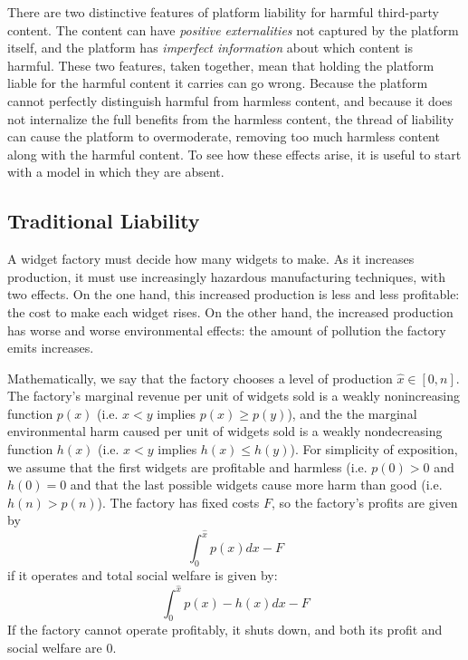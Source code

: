 There are two distinctive features of platform liability for harmful third-party content. The content can have \emph{positive externalities} not captured by the platform itself, and the platform has \emph{imperfect information} about which content is harmful. These two features, taken together, mean that holding the platform liable for the harmful content it carries can go wrong. Because the 
platform cannot perfectly distinguish harmful from harmless content, and because it does not internalize the full benefits from the harmless content, the thread of liability can cause the platform to overmoderate, removing too much harmless content along with the harmful content. To see how these effects arise, it is useful to start with a model in which they are absent.


\subsection{Traditional Liability}

A widget factory must decide how many widgets to make. As it increases production, it must use increasingly hazardous manufacturing techniques, with two effects.  On the one hand, this increased production is less and less profitable: the cost to make each widget rises. On the other hand, the increased production has worse and worse environmental effects: the amount of pollution the factory emits increases.

Mathematically, we say that the factory chooses a level of production $\hat{x} \in [0,n]$. The factory's marginal revenue per unit of widgets sold is a weakly nonincreasing function $p(x)$ (i.e. $x < y$ implies $p(x) \ge p(y)$), and the the marginal environmental harm caused per unit of widgets sold is a weakly nondecreasing function $h(x)$ (i.e. $x < y$ implies $h(x) \le h(y)$). For simplicity of exposition, we assume that the first widgets are profitable and harmless (i.e. $p(0) > 0$ and $h(0) = 0$ and that the last possible widgets cause more harm than good (i.e. $h(n) > p(n)$).  The factory has fixed costs $F$, so the factory's profits are given by 
\begin{equation}
\int_{0}^{\hat{x}} p(x) dx - F
\end{equation}
if it operates and total social welfare is given by:
\begin{equation}
\int_{0}^{\hat{x}} p(x) - h(x) dx - F
\end{equation}
If the factory cannot operate profitably, it shuts down, and both its profit and social welfare are $0$.





